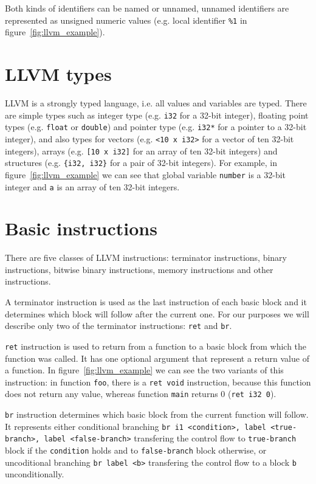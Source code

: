 Both kinds of identifiers can be named or unnamed, unnamed identifiers are
represented as unsigned numeric values (e.g. local identifier \texttt{\%1} in
figure~\ref{fig:llvm_example}).

\section{LLVM types}

LLVM is a strongly typed language, i.e. all values and variables are typed.
There are simple types such as integer type (e.g. \texttt{i32} for a 32-bit
integer), floating point types (e.g. \texttt{float} or \texttt{double}) and
pointer type (e.g. \texttt{i32*} for a pointer to a 32-bit integer), and also
types for vectors (e.g. \texttt{<10 x i32>} for a vector of ten 32-bit
integers), arrays (e.g. \texttt{[10 x i32]} for an array of ten 32-bit integers)
and structures (e.g. \texttt{\{i32, i32\}} for a pair of 32-bit integers). For
example, in figure~\ref{fig:llvm_example} we can see that global variable
\texttt{number} is a 32-bit integer and \texttt{a} is an array of ten
32-bit integers.

\section{Basic instructions}

There are five classes of LLVM instructions: terminator instructions, binary
instructions, bitwise binary instructions, memory instructions and other
instructions.

A terminator instruction is used as the last instruction of each basic block
and it determines which block will follow after the current one. For our
purposes we will describe only two of the terminator instructions: \texttt{ret}
and \texttt{br}.

\texttt{ret} instruction is used to return from a function to a basic block
from which the function was called. It has one optional argument that represent
a return value of a function. In figure~\ref{fig:llvm_example} we can see the
two variants of this instruction: in function \texttt{foo}, there is a
\texttt{ret void} instruction, because this function does not return any value,
whereas function \texttt{main} returns 0 (\texttt{ret i32 0}).

\texttt{br} instruction determines which basic block from the current function
will follow. It represents either conditional branching \texttt{br i1
<condition>, label <true-branch>, label <false-branch>} transfering the control
flow to \texttt{true-branch} block if the \texttt{condition} holds and to
\texttt{false-branch} block otherwise, or uncoditional branching \texttt{br
label <b>} transfering the control flow to a block \texttt{b} unconditionally.

